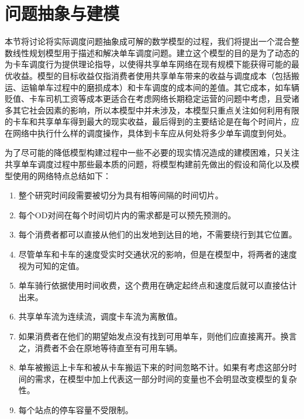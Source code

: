 \documentclass[]{tongjithesis}
\numberwithin{equation}{chapter}
\begin{document}
\section{问题抽象与建模}
本节将讨论将实际调度问题抽象成可解的数学模型的过程，我们将提出一个混合整数线性规划模型用于描述和解决单车调度问题。建立这个模型的目的是为了动态的为卡车调度行为提供理论指导，以使得共享单车网络在现有规模下能获得可能的最优收益。模型的目标收益仅指消费者使用共享单车带来的收益与调度成本（包括搬运、运输单车过程中的磨损成本）和卡车调度的成本间的差值。其它成本，如车辆贬值、卡车司机工资等成本更适合在考虑网络长期稳定运营的问题中考虑，且受诸多其它社会因素的影响，所以本模型中并未涉及，本模型只重点关注如何利用有限的卡车和共享单车得到最大的现实收益，最后得到的主要结论是在每个时间片，应在网络中执行什么样的调度操作，具体到卡车应从何处将多少单车调度到何处。

为了尽可能的降低模型构建过程中一些不必要的现实情况造成的建模困难，只关注共享单车调度过程中那些最本质的问题，将模型构建前先做出的假设和简化以及模型使用的网络特点总结如下：
\begin{enumerate}
	\item 整个研究时间段需要被切分为具有相等间隔的时间切片。
	\item 每个OD对间在每个时间切片内的需求都是可以预先预测的。
	\item 每个消费者都可以直接从他们的出发地到达目的地，不需要绕行到其它位置。
	\item 尽管单车和卡车的速度受实时交通状况的影响，但是在模型中，将两者的速度视为可知的定值。
	\item 单车骑行依据使用时间收费，这个费用在确定起终点和速度后就可以直接估计出来。
	\item 共享单车流为连续流，调度卡车流为离散值。
	\item 如果消费者在他们的期望始发点没有找到可用单车，则他们应直接离开。换言之，消费者不会在原地等待直至有可用车辆。
	\item 单车被搬运上卡车和被从卡车搬运下来的时间忽略不计。如果有考虑这部分时间的需求，在模型中加上代表这一部分时间的变量也不会明显改变模型的复杂性。
	\item 每个站点的停车容量不受限制。
\end{enumerate}
\end{document}
